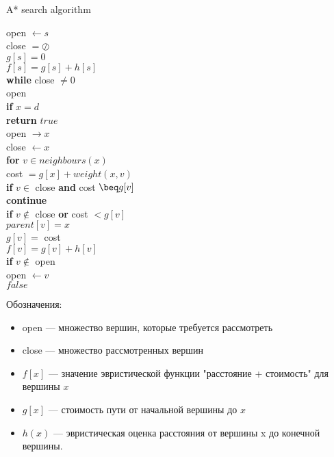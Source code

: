 \documentclass[12pt]{article}
\begin{document}

\begin{algorithm}
\caption{A* search algorithm}
\begin{algorithmic}[1]

\State open $\gets s$ \\
close $= \oslash$ \\
$g[s]=0$ \\
$f[s]=g[s]+h[s]$
\\
\State \textbf{while} close $\neq 0$ \\
 open \\
\qquad \textbf{if} $x = d$ \\
\qquad \qquad \textbf{return} $true$ \\
\qquad open $\rightarrow x$ \\
\qquad close $\gets x$ \\
\qquad \textbf{for} $v \in neighbours(x)$ \\
\qquad \qquad cost $= g[x] + weight(x, v)$ \\
\qquad \qquad \textbf{if} $v \in $ close \textbf{and} cost $\beq g[v]$ \\
\qquad \qquad \qquad \textbf{continue} \\
\qquad \qquad \textbf{if} $v \notin $ close \textbf{or} cost $< g[v]$ \\
\qquad \qquad \qquad $parent[v] = x$ \\
\qquad \qquad \qquad $g[v] = $ cost \\
\qquad \qquad \qquad $f[v] = g[v] + h[v]$ \\
\qquad \qquad \qquad \textbf{if} $v \notin $ open \\
\qquad \qquad \qquad \qquad open $\gets v$ \\

\Return $false$
\end{algorithmic}
\end{algorithm}


Обозначения:

\begin{itemize}
    \item open — множество вершин, которые требуется рассмотреть
    \item close — множество рассмотренных вершин
    \item $f[x]$ — значение эвристической функции "расстояние + стоимость" для вершины $x$
    \item $g[x]$ — стоимость пути от начальной вершины до $x$
    \item $h(x)$ — эвристическая оценка расстояния от вершины x до конечной вершины.
\end{itemize}
\end{document}
